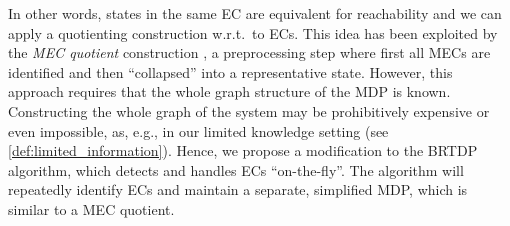 \documentclass{article}
\begin{document}
In other words, states in the same EC are equivalent for reachability and we can apply a quotienting construction w.r.t.\ to ECs.
This idea has been exploited by the \emph{MEC quotient} construction \cite{de1997formal,DBLP:conf/qest/CiesinskiBGK08,DBLP:conf/rp/HaddadM14}, a preprocessing step where first all MECs are identified and then \enquote{collapsed} into a representative state.
However, this approach requires that the whole graph structure of the MDP is known.
Constructing the whole graph of the system may be prohibitively expensive or even impossible, as, e.g., in our limited knowledge setting (see \cref{def:limited_information}).
Hence, we propose a modification to the BRTDP algorithm, which detects and handles ECs \enquote{on-the-fly}.
The algorithm will repeatedly identify ECs and maintain a separate, simplified MDP, which is similar to a MEC quotient.
\end{document}
